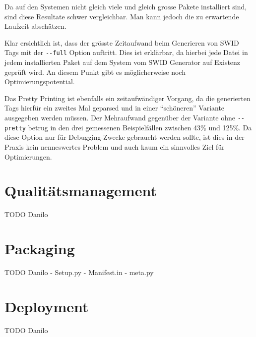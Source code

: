 Da auf den Systemen nicht gleich viele und gleich grosse Pakete installiert
sind, sind diese Resultate schwer vergleichbar. Man kann jedoch die zu
erwartende Laufzeit abschätzen.

Klar ersichtlich ist, dass der grösste Zeitaufwand beim Generieren von SWID Tags
mit der \texttt{-{}-full} Option auftritt. Dies ist erklärbar, da hierbei jede
Datei in jedem installierten Paket auf dem System vom SWID Generator auf
Existenz geprüft wird. An diesem Punkt gibt es möglicherweise noch
Optimierungspotential.

Das Pretty Printing ist ebenfalls ein zeitaufwändiger Vorgang, da die
generierten Tags hierfür ein zweites Mal geparsed und in einer
\enquote{schöneren} Variante ausgegeben werden müssen. Der Mehraufwand gegenüber
der Variante ohne \texttt{-{}-pretty} betrug in den drei gemessenen
Beispielfällen zwischen 43\% und 125\%. Da diese Option nur für Debugging-Zwecke
gebraucht werden sollte, ist dies in der Praxis kein nenneswertes Problem und
auch kaum ein sinnvolles Ziel für Optimierungen.




\section{Qualitätsmanagement}
\label{swidgenerator:architektur:qa}
TODO Danilo



\section{Packaging}
TODO Danilo
- Setup.py
- Manifest.in
- meta.py



\section{Deployment}
\label{swidgenerator:architektur:deployment}
TODO Danilo

